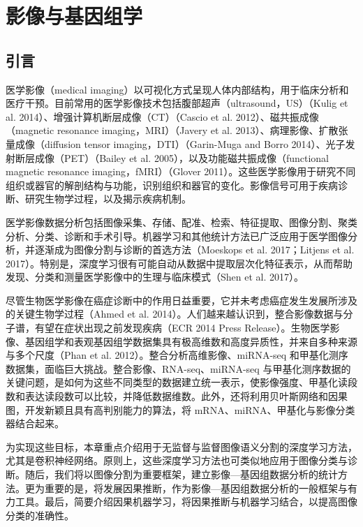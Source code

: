 \chapter{影像与基因组学}
\label{ch:imaging-genomics}
\section{引言}

医学影像（medical imaging）以可视化方式呈现人体内部结构，用于临床分析和医疗干预。目前常用的医学影像技术包括腹部超声（ultrasound，US）（Kulig et al. 2014）、增强计算机断层成像（CT）（Cascio et al. 2012）、磁共振成像（magnetic resonance imaging，MRI）（Javery et al. 2013）、病理影像、扩散张量成像（diffusion tensor imaging，DTI）（Garin-Muga and Borro 2014）、光子发射断层成像（PET）（Bailey et al. 2005），以及功能磁共振成像（functional magnetic resonance imaging，fMRI）（Glover 2011）。这些医学影像用于研究不同组织或器官的解剖结构与功能，识别组织和器官的变化。影像信号可用于疾病诊断、研究生物学过程，以及揭示疾病机制。

医学影像数据分析包括图像采集、存储、配准、检索、特征提取、图像分割、聚类分析、分类、诊断和手术引导。机器学习和其他统计方法已广泛应用于医学图像分析，并逐渐成为图像分割与诊断的首选方法（Moeskops et al. 2017；Litjens et al. 2017）。特别是，深度学习很有可能自动从数据中提取层次化特征表示，从而帮助发现、分类和测量医学影像中的生理与临床模式（Shen et al. 2017）。

尽管生物医学影像在癌症诊断中的作用日益重要，它并未考虑癌症发生发展所涉及的关键生物学过程（Ahmed et al. 2014）。人们越来越认识到，整合影像数据与分子谱，有望在症状出现之前发现疾病（ECR 2014 Press Release）。生物医学影像、基因组学和表观基因组学数据集具有极高维数和高度异质性，并来自多种来源与多个尺度（Phan et al. 2012）。整合分析高维影像、miRNA-seq 和甲基化测序数据集，面临巨大挑战。整合影像、RNA-seq、miRNA-seq 与甲基化测序数据的关键问题，是如何为这些不同类型的数据建立统一表示，使影像强度、甲基化读段数和表达读段数可以比较，并降低数据维数。此外，还将利用贝叶斯网络和因果图，开发新颖且具有高判别能力的算法，将 mRNA、miRNA、甲基化与影像分类器结合起来。

为实现这些目标，本章重点介绍用于无监督与监督图像语义分割的深度学习方法，尤其是卷积神经网络。原则上，这些深度学习方法也可类似地应用于图像分类与诊断。随后，我们将以图像分割为重要框架，建立影像—基因组数据分析的统计方法。更为重要的是，将发展因果推断，作为影像—基因组数据分析的一般框架与有力工具。最后，简要介绍因果机器学习，将因果推断与机器学习结合，以提高图像分类的准确性。

